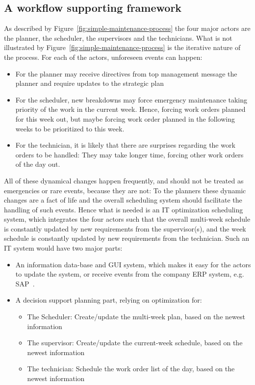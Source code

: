 \documentclass[preprint,12pt,authoryear]{elsarticle}
\begin{document}
\subsection{A workflow supporting framework}
As described by Figure~\ref{fig:simple-maintenance-process} the four major actors are the planner, the scheduler, the supervisors and the technicians. What is not illustrated by Figure~\ref{fig:simple-maintenance-process} is the iterative nature of the process. For each of the actors, unforeseen events can happen:

\begin{itemize}
    \item For the planner may receive directives from top management message the planner and require updates to the strategic plan
    \item For the scheduler, new breakdowns may force emergency maintenance taking priority of the work in the current week. Hence, forcing work orders planned for this week out, but maybe forcing work order planned in the following weeks to be prioritized to this week.
    \item For the technician, it is likely that there are surprises regarding the work orders to be handled: They may take longer time, forcing other work orders of the day out.
\end{itemize}

All of these dynamical changes happen frequently, and should not be treated as emergencies or rare events, because they are not: To the planners these dynamic changes are a fact of life and the overall scheduling system should facilitate the handling of such events. Hence what is needed is an IT optimization scheduling system, which integrates the four actors such that the overall multi-week schedule is constantly updated by new requirements from the supervisor(s), and the week schedule is constantly updated by new requirements from the technician. Such an IT system would have two major parts:

\begin{itemize}
    \item An information data-base and GUI system, which makes it easy for the actors to update the system, or receive events from the company ERP system, e.g. SAP~\cite{???}.
    \item A decision support planning part, relying on optimization for:
    \begin{itemize}
        \item The Scheduler: Create/update the multi-week plan, based on the newest information
        \item The supervisor: Create/update the current-week schedule, based on the newest information
        \item The technician: Schedule the work order list of the day, based on the newest information
    \end{itemize}
\end{itemize}
\end{document}
